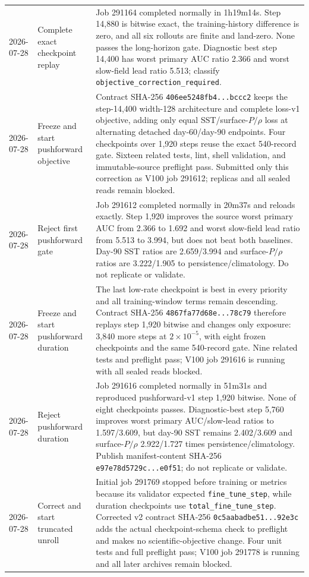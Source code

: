 \documentclass[11pt]{article}
\begin{document}
\begin{longtable}{@{}p{}p{}p{}@{}}
2026-07-28 & Complete exact checkpoint replay & Job 291164 completed normally in 1h19m14s.  Step 14,880 is bitwise exact, the training-history difference is zero, and all six rollouts are finite and land-zero.  None passes the long-horizon gate.  Diagnostic best step 14,400 has worst primary AUC ratio 2.366 and worst slow-field lead ratio 5.513; classify \texttt{objective\_correction\_required}. \\
2026-07-28 & Freeze and start pushforward objective & Contract SHA-256 \texttt{406ee5248fb4...bccc2} keeps the step-14,400 width-128 architecture and complete loss-v1 objective, adding only equal SST/surface-\(P/\rho\) loss at alternating detached day-60/day-90 endpoints.  Four checkpoints over 1,920 steps reuse the exact 540-record gate.  Sixteen related tests, lint, shell validation, and immutable-source preflight pass.  Submitted only this correction as V100 job 291612; replicas and all sealed reads remain blocked. \\
2026-07-28 & Reject first pushforward gate & Job 291612 completed normally in 20m37s and reloads exactly.  Step 1,920 improves the source worst primary AUC from 2.366 to 1.692 and worst slow-field lead ratio from 5.513 to 3.994, but does not beat both baselines.  Day-90 SST ratios are 2.659/3.994 and surface-\(P/\rho\) ratios are 3.222/1.905 to persistence/climatology.  Do not replicate or validate. \\
2026-07-28 & Freeze and start pushforward duration & The last low-rate checkpoint is best in every priority and all training-window terms remain descending.  Contract SHA-256 \texttt{4867fa77d68e...78c79} therefore replays step 1,920 bitwise and changes only exposure: 3,840 more steps at \(2\times10^{-5}\), with eight frozen checkpoints and the same 540-record gate.  Nine related tests and preflight pass; V100 job 291616 is running with all sealed reads blocked. \\
2026-07-28 & Reject pushforward duration & Job 291616 completed normally in 51m31s and reproduced pushforward-v1 step 1,920 bitwise.  None of eight checkpoints passes.  Diagnostic-best step 5,760 improves worst primary AUC/slow-lead ratios to 1.597/3.609, but day-90 SST remains 2.402/3.609 and surface-\(P/\rho\) 2.922/1.727 times persistence/climatology.  Publish manifest-content SHA-256 \texttt{e97e78d5729c...e0f51}; do not replicate or validate. \\
2026-07-28 & Correct and start truncated unroll & Initial job 291769 stopped before training or metrics because its validator expected \texttt{fine\_tune\_step}, while duration checkpoints use \texttt{total\_fine\_tune\_step}.  Corrected v2 contract SHA-256 \texttt{0c5aabadbe51...92e3c} adds the actual checkpoint-schema check to preflight and makes no scientific-objective change.  Four unit tests and full preflight pass; V100 job 291778 is running and all later archives remain blocked. \\

\end{longtable}
\end{document}
